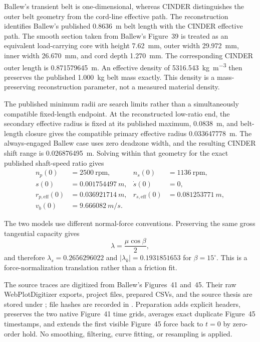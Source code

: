 \documentclass[11pt]{report}
\numberwithin{equation}{section}
\begin{document}
Ballew's transient belt is one-dimensional, whereas CINDER distinguishes the
outer belt geometry from the cord-line effective path. The reconstruction
identifies Ballew's published \SI{0.8636}{m} belt length with the CINDER
effective path. The smooth section taken from Ballew's Figure~39 is treated as
an equivalent load-carrying core with height \SI{7.62}{mm}, outer width
\SI{29.972}{mm}, inner width \SI{26.670}{mm}, and cord depth
\SI{1.270}{mm}. The corresponding CINDER outer length is
\SI{0.871579645}{m}. An effective density of
\SI{5316.543}{\kilogram\per\meter\cubed} then preserves the published
\SI{1.000}{kg} belt mass exactly. This density is a mass-preserving
reconstruction parameter, not a measured material density.

The published minimum radii are search limits rather than a simultaneously
compatible fixed-length endpoint. At the reconstructed low-ratio end, the
secondary effective radius is fixed at its published maximum,
\SI{0.0838}{m}, and belt-length closure gives the compatible primary effective
radius \SI{0.033647778}{m}. The always-engaged Ballew case uses zero deadzone
width, and the resulting CINDER shift range is \SI{0.026876495}{m}. Solving
within that geometry for the exact published shaft-speed ratio gives
\begin{equation}
\begin{aligned}
n_p(0)&=2500~\mathrm{rpm},&
n_s(0)&=1136~\mathrm{rpm},\\
s(0)&=\SI{0.001754497}{m},&
\dot s(0)&=0,\\
r_{p,\mathrm{eff}}(0)&=\SI{0.036921714}{m},&
r_{s,\mathrm{eff}}(0)&=\SI{0.081253771}{m},\\
v_b(0)&=\SI{9.666082}{m/s}.&&
\end{aligned}
\label{eq:ballew_reconstructed_initial_state}
\end{equation}

The two models use different normal-force conventions. Preserving the same
gross tangential capacity gives
\begin{equation}
\lambda=\frac{\mu\cos\beta}{2},
\label{eq:ballew_friction_translation}
\end{equation}
and therefore \(\lambda_s=0.2656296022\) and
\(\lvert\lambda_k\rvert=0.1931851653\) for \(\beta=15^\circ\).
This is a force-normalization translation rather than a friction fit.

The source traces are digitized from Ballew's Figures~41 and~45. Their raw
WebPlotDigitizer exports, project files, prepared CSVs, and the source thesis
are stored under
; file hashes are
recorded in
.
Preparation adds explicit headers, preserves the two native Figure~41 time
grids, averages exact duplicate Figure~45 timestamps, and extends the first
visible Figure~45 force back to \(t=0\) by zero-order hold. No smoothing,
filtering, curve fitting, or resampling is applied.
\end{document}
